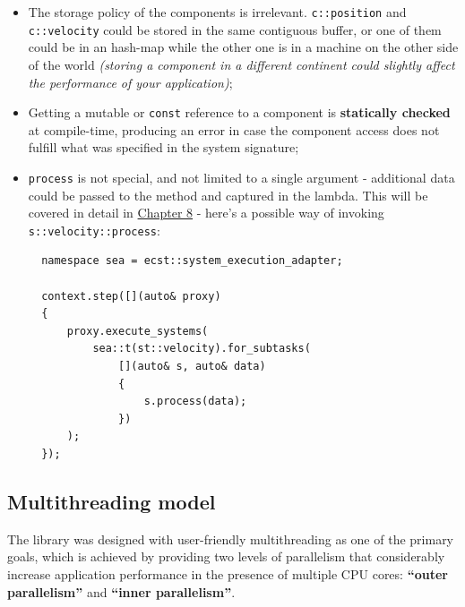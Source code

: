 \documentclass[oneside, 12pt, a4paper, openany]{book}
\begin{document}
\begin{itemize}
\item
  The storage policy of the components is irrelevant.
  \texttt{c::position}
  and
  \texttt{c::velocity}
  could be stored in the same contiguous buffer, or one of them could be
  in an hash-map while the other one is in a machine on the other side
  of the world \emph{(storing a component in a different continent could
  slightly affect the performance of your application)};
\item
  Getting a mutable or
  \texttt{const}
  reference to a component is \textbf{statically checked} at
  compile-time, producing an error in case the component access does not
  fulfill what was specified in the system signature;
\item
  \texttt{process}
  is not special, and not limited to a single argument - additional data
  could be passed to the method and captured in the lambda. This will be
  covered in detail in \protect\hyperlink{chap_flow}{Chapter 8} - here's
  a possible way of invoking
  \texttt{s::velocity::process}:

  \begin{verbatim}
  namespace sea = ecst::system_execution_adapter;

  context.step([](auto& proxy)
  {
      proxy.execute_systems(
          sea::t(st::velocity).for_subtasks(
              [](auto& s, auto& data)
              {
                  s.process(data);
              })
      );
  });
  \end{verbatim}
\end{itemize}

\subsection{Multithreading model}\label{multithreading-model}

The library was designed with user-friendly multithreading as one of the
primary goals, which is achieved by providing two levels of parallelism
that considerably increase application performance in the presence of
multiple CPU cores: \textbf{``outer parallelism''} and \textbf{``inner
parallelism''}.
\end{document}

